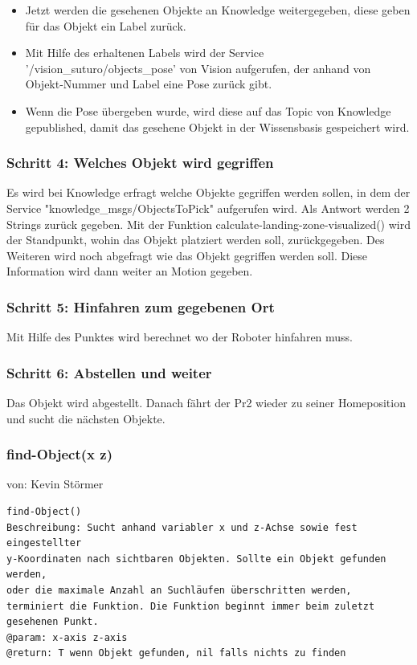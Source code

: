 \documentclass{suturo}
\makeatletter
\newcommand{\chapterauthor}[1]{%
  {\parindent0pt\vspace*{-27pt}%
  \linespread{0}\small\begin{flushright}von: #1\end{flushright}%
  \par\nobreak\vspace*{0pt}}
  \@afterheading%
}
\makeatother
\begin{document}
\begin{itemize} 
\item Jetzt werden die gesehenen Objekte an Knowledge weitergegeben, diese geben für das Objekt ein Label zurück.
\item Mit Hilfe des erhaltenen Labels wird der Service '/vision\_suturo/objects\_pose' von Vision aufgerufen, der anhand von Objekt-Nummer und Label eine Pose zurück gibt.  
\item Wenn die Pose übergeben wurde, wird diese auf das Topic von Knowledge gepublished, damit das gesehene Objekt in der Wissensbasis gespeichert wird.
\end{itemize}





\subsubsection{Schritt 4: Welches Objekt wird gegriffen}
Es wird bei Knowledge erfragt welche Objekte gegriffen werden sollen, in dem der Service "knowledge\_msgs/ObjectsToPick" 
aufgerufen wird. Als Antwort werden 2 Strings zurück gegeben.
Mit der Funktion calculate-landing-zone-visualized() wird der Standpunkt, wohin das Objekt platziert werden soll, zurückgegeben. %
Des Weiteren wird noch abgefragt wie das Objekt gegriffen werden soll. Diese Information wird dann weiter an Motion gegeben.

\subsubsection{Schritt 5: Hinfahren zum gegebenen Ort}
Mit Hilfe des Punktes wird berechnet wo der Roboter hinfahren muss. 
 
\subsubsection{Schritt 6: Abstellen und weiter}
Das Objekt wird abgestellt.
Danach fährt der Pr2 wieder zu seiner Homeposition und sucht die nächsten Objekte.






\subsubsection{find-Object(x z)}
\chapterauthor{Kevin Störmer}
\begin{verbatim}
find-Object()
Beschreibung: Sucht anhand variabler x und z-Achse sowie fest eingestellter
y-Koordinaten nach sichtbaren Objekten. Sollte ein Objekt gefunden werden,
oder die maximale Anzahl an Suchläufen überschritten werden,
terminiert die Funktion. Die Funktion beginnt immer beim zuletzt gesehenen Punkt.
@param: x-axis z-axis
@return: T wenn Objekt gefunden, nil falls nichts zu finden
\end{verbatim}
\end{document}
